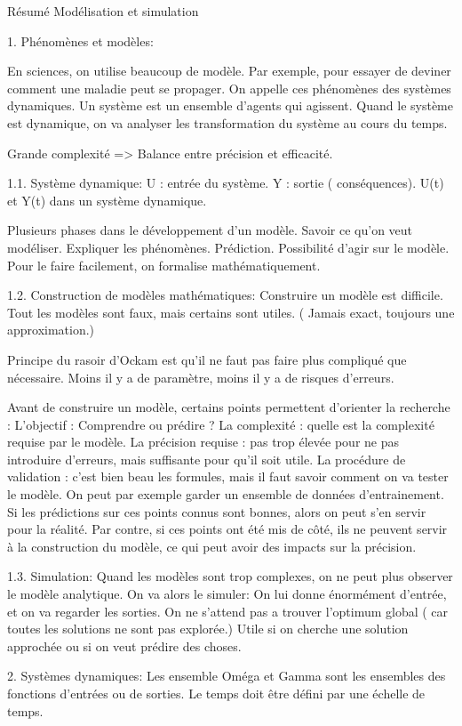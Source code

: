 Résumé Modélisation et simulation

1. Phénomènes et modèles:

En sciences, on utilise beaucoup de modèle. Par exemple, pour essayer de deviner comment une maladie peut se propager. On appelle ces phénomènes des systèmes dynamiques.
Un système est un ensemble d’agents qui agissent. Quand le système est dynamique, on va analyser les transformation du système au cours du temps.

Grande complexité => Balance entre précision et efficacité.

1.1. Système dynamique:
U : entrée du système.
Y : sortie  ( conséquences).
U(t) et Y(t) dans un système dynamique.

Plusieurs phases dans le développement d’un modèle.
Savoir ce qu’on veut modéliser.
Expliquer les phénomènes.
Prédiction.
Possibilité d’agir sur le modèle.
Pour le faire facilement, on formalise mathématiquement.

1.2. Construction de modèles mathématiques:
Construire un modèle est difficile.
Tout les modèles sont faux, mais certains sont utiles. ( Jamais exact, toujours une approximation.)

Principe du rasoir d’Ockam est qu’il ne faut pas faire plus compliqué que nécessaire.
Moins il y a de paramètre, moins il y a de risques d’erreurs.

Avant de construire un modèle, certains points permettent d'orienter la recherche :
L'objectif : Comprendre ou prédire ?
La complexité : quelle est la complexité requise par le modèle.
La précision requise : pas trop élevée pour ne pas introduire d'erreurs, mais suffisante pour qu'il soit utile.
La procédure de validation : c'est bien beau les formules, mais il faut savoir comment on va tester le modèle. On peut par exemple garder un ensemble de données d'entrainement. Si les prédictions sur ces points connus sont bonnes, alors on peut s'en servir pour la réalité. Par contre, si ces points ont été mis de côté, ils ne peuvent servir à la construction du modèle, ce qui peut avoir des impacts sur la précision.

1.3. Simulation:
Quand les modèles sont trop complexes, on ne peut plus observer le modèle analytique.
On va alors le simuler: On lui donne énormément d’entrée, et on va regarder les sorties.
On ne s’attend pas a trouver l’optimum global ( car toutes les solutions ne sont pas explorée.)
Utile si on cherche une solution approchée ou si on veut prédire des choses.

2. Systèmes dynamiques:
Les ensemble Oméga et Gamma sont les ensembles des fonctions d’entrées ou de sorties.
Le temps doit être défini par une échelle de temps.


